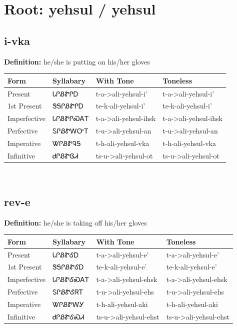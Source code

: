 \documentclass{article}%
\begin{document}
%
\normalsize%
\section*{Root: yehsul / yehsul}%
\subsection*{i-vka}%
\textbf{Definition: }%
he/she is putting on his/her gloves%
\\[0.5em]%
\begin{tabular}{|l|l|l|l|}%
\hline%
\textbf{Form}&\textbf{Syllabary}&\textbf{With Tone}&\textbf{Toneless}\\%
\hline%
Present&ᏓᎵᏰᏑᎵᎠ&t{-}a{-}>ali{-}yehsul{-}i'&t{-}a{-}>ali{-}yehsul{-}i'\\%
1st Present&ᏕᎦᎵᏰᏑᎵᎠ&te{-}k{-}ali{-}yehsul{-}i'&te{-}k{-}ali{-}yehsul{-}i'\\%
Imperfective&ᏓᎵᏰᏑᎵᏍᎪᎢ&t{-}a{-}>ali{-}yehsul{-}ihsk&t{-}a{-}>ali{-}yehsul{-}ihsk\\%
Perfective&ᏚᎵᏰᏑᎳᏅᎢ&t{-}u{-}>ali{-}yehsul{-}an&t{-}u{-}>ali{-}yehsul{-}an\\%
Imperative&ᏔᎵᏰᏑᎸᎦ&t{-}h{-}ali{-}yehsul{-}vka&t{-}h{-}ali{-}yehsul{-}vka\\%
Infinitive&ᏧᎵᏰᏑᎶᏗ&ts{-}u{-}>ali{-}yehsul{-}ot&ts{-}u{-}>ali{-}yehsul{-}ot\\%
\hline%
\end{tabular}%
\\[1em]%
\subsection*{rev-e}%
\textbf{Definition: }%
he/she is taking off his/her gloves%
\\[0.5em]%
\begin{tabular}{|l|l|l|l|}%
\hline%
\textbf{Form}&\textbf{Syllabary}&\textbf{With Tone}&\textbf{Toneless}\\%
\hline%
Present&ᏓᎵᏰᏑᎴᎠ&t{-}a{-}>ali{-}yehsul{-}e'&t{-}a{-}>ali{-}yehsul{-}e'\\%
1st Present&ᏕᎦᎵᏰᏑᎴᎠ&te{-}k{-}ali{-}yehsul{-}e'&te{-}k{-}ali{-}yehsul{-}e'\\%
Imperfective&ᏓᎵᏰᏑᎴᏍᎪᎢ&t{-}a{-}>ali{-}yehsul{-}ehsk&t{-}a{-}>ali{-}yehsul{-}ehsk\\%
Perfective&ᏚᎵᏰᏑᎴᏒᎢ&t{-}u{-}>ali{-}yehsul{-}ehs&t{-}u{-}>ali{-}yehsul{-}ehs\\%
Imperative&ᏔᎵᏰᏑᎳᎩ&t{-}h{-}ali{-}yehsul{-}aki&t{-}h{-}ali{-}yehsul{-}aki\\%
Infinitive&ᏧᎵᏰᏑᎴᏍᏗ&ts{-}u{-}>ali{-}yehsul{-}ehst&ts{-}u{-}>ali{-}yehsul{-}ehst\\%
\hline%
\end{tabular}%
\\[1em]%
\end{document}
